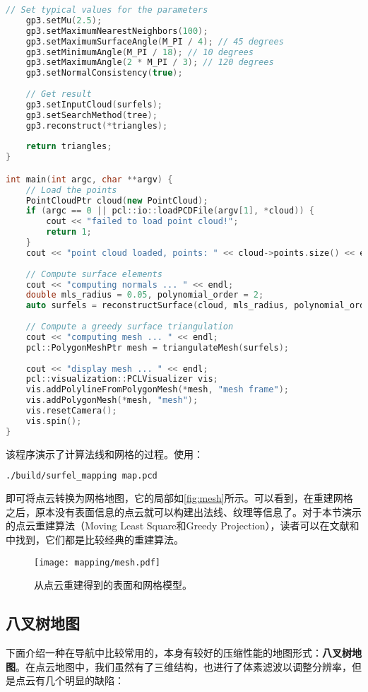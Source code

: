 \begin{lstlisting}[language=c++,caption=slambook2/ch12/dense_RGBD/surfel_mapping.cpp]
    // Set typical values for the parameters
    gp3.setMu(2.5);
    gp3.setMaximumNearestNeighbors(100);
    gp3.setMaximumSurfaceAngle(M_PI / 4); // 45 degrees
    gp3.setMinimumAngle(M_PI / 18); // 10 degrees
    gp3.setMaximumAngle(2 * M_PI / 3); // 120 degrees
    gp3.setNormalConsistency(true);
    
    // Get result
    gp3.setInputCloud(surfels);
    gp3.setSearchMethod(tree);
    gp3.reconstruct(*triangles);
    
    return triangles;
}

int main(int argc, char **argv) {
    // Load the points
    PointCloudPtr cloud(new PointCloud);
    if (argc == 0 || pcl::io::loadPCDFile(argv[1], *cloud)) {
        cout << "failed to load point cloud!";
        return 1;
    }
    cout << "point cloud loaded, points: " << cloud->points.size() << endl;
    
    // Compute surface elements
    cout << "computing normals ... " << endl;
    double mls_radius = 0.05, polynomial_order = 2;
    auto surfels = reconstructSurface(cloud, mls_radius, polynomial_order);
    
    // Compute a greedy surface triangulation
    cout << "computing mesh ... " << endl;
    pcl::PolygonMeshPtr mesh = triangulateMesh(surfels);
    
    cout << "display mesh ... " << endl;
    pcl::visualization::PCLVisualizer vis;
    vis.addPolylineFromPolygonMesh(*mesh, "mesh frame");
    vis.addPolygonMesh(*mesh, "mesh");
    vis.resetCamera();
    vis.spin();
}
\end{lstlisting}
该程序演示了计算法线和网格的过程。使用：
\begin{lstlisting}[language=sh,caption=终端输入：]
./build/surfel_mapping map.pcd
\end{lstlisting}
即可将点云转换为网格地图，它的局部如\autoref{fig:mesh}所示。可以看到，在重建网格之后，原本没有表面信息的点云就可以构建出法线、纹理等信息了。对于本节演示的点云重建算法（Moving Least Square和Greedy Projection），读者可以在文献\cite{Alexa2003}和\cite{Marton2009}中找到，它们都是比较经典的重建算法。

\begin{figure}[!htp]
    \centering
    \texttt{[image: mapping/mesh.pdf]}
    \caption{从点云重建得到的表面和网格模型。}
    \label{fig:mesh}
\end{figure}

\subsection{八叉树地图}
下面介绍一种在导航中比较常用的，本身有较好的压缩性能的地图形式：\textbf{八叉树地图}。在点云地图中，我们虽然有了三维结构，也进行了体素滤波以调整分辨率，但是点云有几个明显的缺陷：

